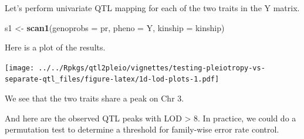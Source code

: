 \documentclass[oneside]{book}\usepackage[]{graphicx}\usepackage[]{color}
\newenvironment{Shaded}{\begin{snugshade}}{\end{snugshade}}
\newcommand{\CommentTok}[1]{\textcolor[rgb]{0.56,0.35,0.01}{\textit{#1}}}
\newcommand{\DataTypeTok}[1]{\textcolor[rgb]{0.13,0.29,0.53}{#1}}
\newcommand{\DecValTok}[1]{\textcolor[rgb]{0.00,0.00,0.81}{#1}}
\newcommand{\KeywordTok}[1]{\textcolor[rgb]{0.13,0.29,0.53}{\textbf{#1}}}
\newcommand{\NormalTok}[1]{#1}
\newcommand{\OperatorTok}[1]{\textcolor[rgb]{0.81,0.36,0.00}{\textbf{#1}}}
\newcommand{\OtherTok}[1]{\textcolor[rgb]{0.56,0.35,0.01}{#1}}
\newcommand{\StringTok}[1]{\textcolor[rgb]{0.31,0.60,0.02}{#1}}
\begin{document}
Let's perform univariate QTL mapping for each of the two traits in the Y
matrix.

\begin{Shaded}
\begin{Highlighting}[]
\NormalTok{s1 <-}\StringTok{ }\KeywordTok{scan1}\NormalTok{(}\DataTypeTok{genoprobs =}\NormalTok{ pr, }\DataTypeTok{pheno =}\NormalTok{ Y, }\DataTypeTok{kinship =}\NormalTok{ kinship)}
\end{Highlighting}
\end{Shaded}

Here is a plot of the results.

\begin{Shaded}
\end{Shaded}

\texttt{[image: ../../Rpkgs/qtl2pleio/vignettes/testing-pleiotropy-vs-separate-qtl\_files/figure-latex/1d-lod-plots-1.pdf]}

We see that the two traits share a peak on Chr 3.

And here are the observed QTL peaks with LOD \textgreater{} 8. In
practice, we could do a permutation test to determine a threshold for
family-wise error rate control.

\begin{Shaded}
\end{Shaded}
\end{document}

